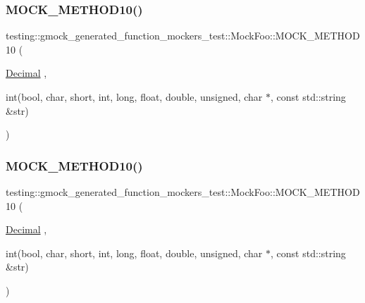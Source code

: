 \subsubsection{\texorpdfstring{MOCK\_METHOD10()}{MOCK\_METHOD10()}\hspace{0.1cm}{\footnotesize\ttfamily [2/3]}}
{\footnotesize\ttfamily testing\+::gmock\+\_\+generated\+\_\+function\+\_\+mockers\+\_\+test\+::\+Mock\+Foo\+::\+M\+O\+C\+K\+\_\+\+M\+E\+T\+H\+O\+D10 (\begin{DoxyParamCaption}\item[{\mbox{\hyperlink{classtesting_1_1gmock__generated__function__mockers__test_1_1_foo_interface_a5a389017205848c7b7055c071cca0c6d}{Decimal}}}]{,  }\item[{int(bool, char, short, int, long, float, double, unsigned, char $\ast$, const std\+::string \&str)}]{ }\end{DoxyParamCaption})}

\mbox{\label{classtesting_1_1gmock__generated__function__mockers__test_1_1_mock_foo_ab0a37a844eb43c36ca45cff5274bd9e9}} 
\subsubsection{\texorpdfstring{MOCK\_METHOD10()}{MOCK\_METHOD10()}\hspace{0.1cm}{\footnotesize\ttfamily [3/3]}}
{\footnotesize\ttfamily testing\+::gmock\+\_\+generated\+\_\+function\+\_\+mockers\+\_\+test\+::\+Mock\+Foo\+::\+M\+O\+C\+K\+\_\+\+M\+E\+T\+H\+O\+D10 (\begin{DoxyParamCaption}\item[{\mbox{\hyperlink{classtesting_1_1gmock__generated__function__mockers__test_1_1_foo_interface_a5a389017205848c7b7055c071cca0c6d}{Decimal}}}]{,  }\item[{int(bool, char, short, int, long, float, double, unsigned, char $\ast$, const std\+::string \&str)}]{ }\end{DoxyParamCaption})}

\mbox{\label{classtesting_1_1gmock__generated__function__mockers__test_1_1_mock_foo_a50f8c94d6fab258d49e1d4a15ea7a7af}} 
